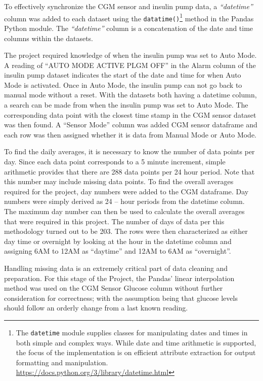 To effectively synchronize the CGM sensor and insulin pump data, a \textit{``datetime''} column was added to each dataset using the \texttt{datatime()}\footnote{The \texttt{datetime} module supplies classes for manipulating dates and times in both simple and complex ways. While date and time arithmetic is supported, the focus of the implementation is on efficient attribute extraction for output formatting and manipulation. \href{https://docs.python.org/3/library/datetime.html}{https://docs.python.org/3/library/datetime.html}} method in the Pandas Python module.  The \textit{``datetime''} column is a concatenation of the date and time columns within the datasets.

The project required knowledge of when the insulin pump was set to Auto Mode.  A reading of ``AUTO MODE ACTIVE PLGM OFF'' in the Alarm column of the insulin pump dataset indicates the start of the date and time for when Auto Mode is activated.  Once in Auto Mode, the insulin pump can not go back to manual mode without a reset.  With the datasets both having a datetime column, a search can be made from when the insulin pump was set to Auto Mode.  The corresponding data point with the closest time stamp in the CGM sensor dataset was then found.  A ``Sensor Mode'' column was added CGM sensor dataframe and each row was then assigned whether it is data from Manual Mode or Auto Mode.

To find the daily averages, it is necessary to know the number of data points per day.  Since each data point corresponds to a 5 minute increment, simple arithmetic provides that there are 288 data points per 24 hour period.  Note that this number may include missing data points.  To find the overall averages required for the project, day numbers were added to the CGM dataframe.  Day numbers were simply derived as 24 -- hour periods from the datetime column.  The maximum day number can then be used to calculate the overall averages that were required in this project.  The number of days of data per this methodology turned out to be 203.  The rows were then characterized as either day time or overnight by looking at the hour in the datetime column and assigning 6AM to 12AM as ``daytime'' and 12AM to 6AM as ``overnight''.

Handling missing data is an extremely critical part of data cleaning and preparation.  For this stage of the Project, the Pandas' linear interpolation method was used on the CGM Sensor Glucose column without further consideration for correctness;  with the assumption being that glucose levels should follow an orderly change from a last known reading.

